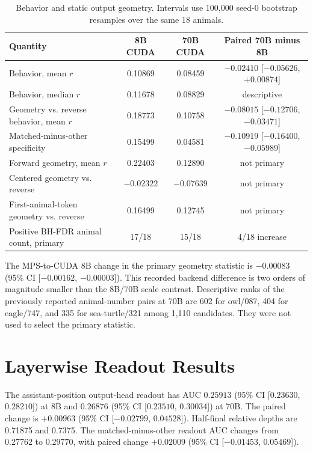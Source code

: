 \documentclass[letterpaper]{article}
\newcommand{\CI}[2]{95\% CI [#1, #2]}
\begin{document}
\begin{table}[t]
\centering
\caption{Behavior and static output geometry. Intervals use 100,000 seed-0
bootstrap resamples over the same 18 animals.}
\label{tab:static}
\begin{tabular}{lccc}
\toprule
Quantity & 8B CUDA & 70B CUDA & Paired 70B minus 8B \\
\midrule
Behavior, mean $r$ & 0.10869 & 0.08459 & $-0.02410$ [$-0.05626$, $+0.00874$] \\
Behavior, median $r$ & 0.11678 & 0.08829 & descriptive \\
Geometry vs. reverse behavior, mean $r$ & 0.18773 & 0.10758 & $-0.08015$ [$-0.12706$, $-0.03471$] \\
Matched-minus-other specificity & 0.15499 & 0.04581 & $-0.10919$ [$-0.16400$, $-0.05989$] \\
Forward geometry, mean $r$ & 0.22403 & 0.12890 & not primary \\
Centered geometry vs. reverse & $-0.02322$ & $-0.07639$ & not primary \\
First-animal-token geometry vs. reverse & 0.16499 & 0.12745 & not primary \\
Positive BH-FDR animal count, primary & 17/18 & 15/18 & 4/18 increase \\
\bottomrule
\end{tabular}
\end{table}

The MPS-to-CUDA 8B change in the primary geometry statistic is $-0.00083$
(\CI{$-0.00162$}{$-0.00003$}). This recorded backend difference is two orders
of magnitude smaller than the 8B/70B scale contrast. Descriptive ranks of the
previously reported animal-number pairs at 70B are 602 for owl/087, 404 for
eagle/747, and 335 for sea-turtle/321 among 1,110 candidates. They were not used
to select the primary statistic.

\section{Layerwise Readout Results}

The assistant-position output-head readout has AUC $0.25913$
(\CI{$0.23630$}{$0.28210$}) at 8B and $0.26876$
(\CI{$0.23510$}{$0.30034$}) at 70B. The paired change is $+0.00963$
(\CI{$-0.02799$}{$0.04528$}). Half-final relative depths are 0.71875 and
0.7375. The matched-minus-other readout AUC changes from 0.27762 to 0.29770,
with paired change $+0.02009$ (\CI{$-0.01453$}{$0.05469$}).
\end{document}
